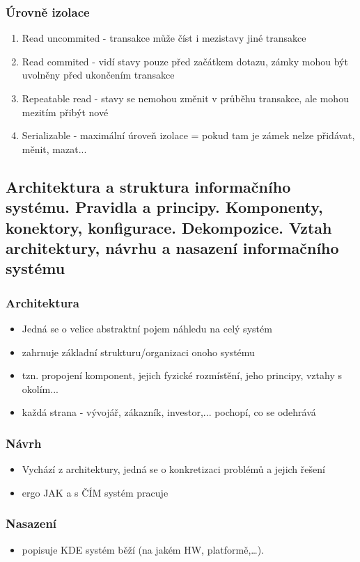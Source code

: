 \documentclass[10pt,a4paper]{article}
\begin{document}
\subsubsection{Úrovně izolace}

\begin{enumerate}
\item Read uncommited - transakce může číst i mezistavy jiné transakce
\item Read commited - vidí stavy pouze před začátkem dotazu, zámky mohou být uvolněny před ukončením transakce
\item Repeatable read - stavy se nemohou změnit v průběhu transakce, ale mohou mezitím přibýt nové
\item Serializable - maximální úroveň izolace = pokud tam je zámek nelze přidávat, měnit, mazat...
\end{enumerate}

\subsection{Architektura a struktura informačního systému. Pravidla a principy. Komponenty, konektory, konfigurace. Dekompozice. Vztah architektury, návrhu a nasazení informačního systému}
\subsubsection{Architektura}
\begin{itemize}
\item Jedná se o velice abstraktní pojem náhledu na celý systém
\item zahrnuje základní strukturu/organizaci onoho systému
\item tzn. propojení komponent, jejich fyzické rozmístění, jeho principy, vztahy s okolím...
\item každá strana - vývojář, zákazník, investor,... pochopí, co se odehrává
\end{itemize}
\subsubsection{Návrh}
\begin{itemize}
\item Vychází z architektury, jedná se o konkretizaci problémů a jejich řešení
\item ergo JAK a s ČÍM systém pracuje
\end{itemize}
\subsubsection{Nasazení}
\begin{itemize}
\item popisuje KDE systém běží (na jakém HW, platformě,…).
\end{itemize}
\end{document}
